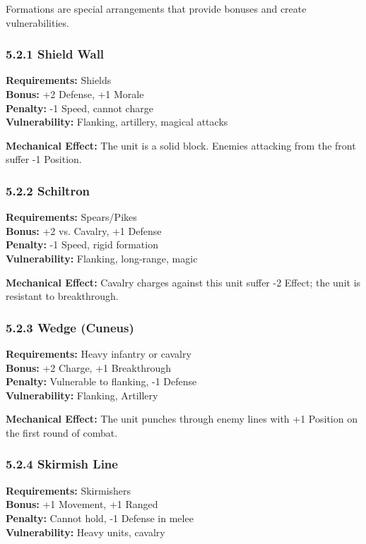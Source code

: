 \documentclass[11pt]{article}
\begin{document}
Formations are special arrangements that provide bonuses and create vulnerabilities.

\subsubsection{5.2.1 Shield Wall}

\textbf{Requirements:} Shields\\
\textbf{Bonus:} +2 Defense, +1 Morale\\
\textbf{Penalty:} -1 Speed, cannot charge\\
\textbf{Vulnerability:} Flanking, artillery, magical attacks

\textbf{Mechanical Effect:} The unit is a solid block. Enemies attacking from the front suffer -1 Position.

\subsubsection{5.2.2 Schiltron}

\textbf{Requirements:} Spears/Pikes\\
\textbf{Bonus:} +2 vs. Cavalry, +1 Defense\\
\textbf{Penalty:} -1 Speed, rigid formation\\
\textbf{Vulnerability:} Flanking, long-range, magic

\textbf{Mechanical Effect:} Cavalry charges against this unit suffer -2 Effect; the unit is resistant to breakthrough.

\subsubsection{5.2.3 Wedge (Cuneus)}

\textbf{Requirements:} Heavy infantry or cavalry\\
\textbf{Bonus:} +2 Charge, +1 Breakthrough\\
\textbf{Penalty:} Vulnerable to flanking, -1 Defense\\
\textbf{Vulnerability:} Flanking, Artillery

\textbf{Mechanical Effect:} The unit punches through enemy lines with +1 Position on the first round of combat.

\subsubsection{5.2.4 Skirmish Line}

\textbf{Requirements:} Skirmishers\\
\textbf{Bonus:} +1 Movement, +1 Ranged\\
\textbf{Penalty:} Cannot hold, -1 Defense in melee\\
\textbf{Vulnerability:} Heavy units, cavalry
\end{document}
